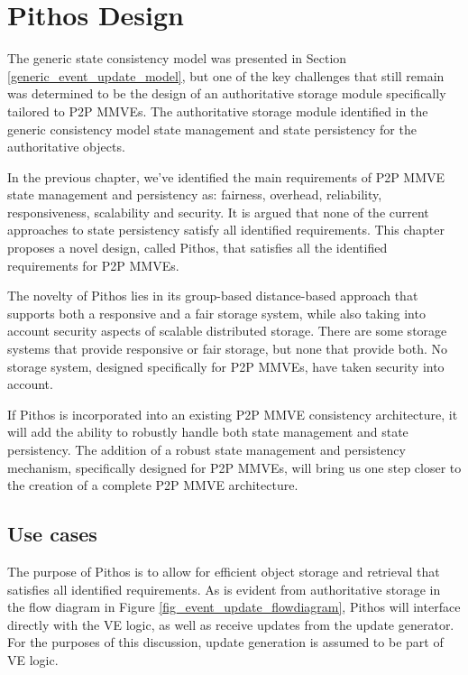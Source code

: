 \chapter{Pithos Design}
\label{chp:DESIGN}

The generic state consistency model was presented in Section \ref{generic_event_update_model}, but one of the key challenges that still remain was determined to be the design of an authoritative storage module specifically tailored to P2P MMVEs. The authoritative storage module identified in the generic consistency model state management and state persistency for the authoritative objects.

In the previous chapter, we've identified the main requirements of P2P MMVE state management and persistency as: fairness, overhead, reliability, responsiveness, scalability and security. It is argued that none of the current approaches to state persistency satisfy all identified requirements. This chapter proposes a novel design, called Pithos, that satisfies all the identified requirements for P2P MMVEs.

The novelty of Pithos lies in its group-based distance-based approach that supports both a responsive and a fair storage system, while also taking into account security aspects of scalable distributed storage. There are some storage systems that provide responsive or fair storage, but none that provide both. No storage system, designed specifically for P2P MMVEs, have taken security into account.

If Pithos is incorporated into an existing P2P MMVE consistency architecture, it will add the ability to robustly handle both state management and state persistency. The addition of a robust state management and persistency mechanism, specifically designed for P2P MMVEs, will bring us one step closer to the creation of a complete P2P MMVE architecture.

\section{Use cases}
\label{use_cases_goals}

The purpose of Pithos is to allow for efficient object storage and retrieval that satisfies all identified requirements. As is evident from authoritative storage in the flow diagram in Figure \ref{fig_event_update_flowdiagram}, Pithos will interface directly with the VE logic, as well as receive updates from the update generator. For the purposes of this discussion, update generation is assumed to be part of VE logic.


